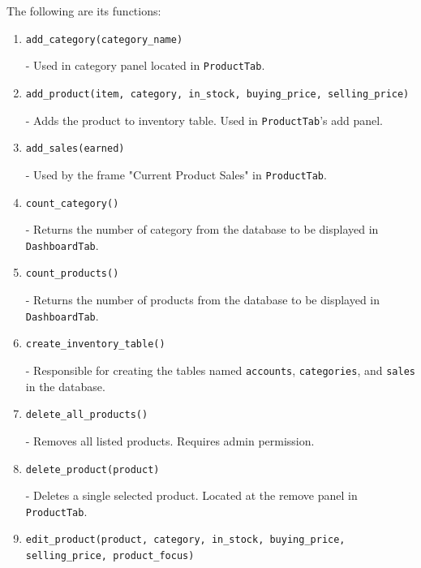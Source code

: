 \documentclass[12pt,a4paper]{article}
\renewcommand{\indent}{\hspace\parindent}
\begin{document}
        \hfill{}

        \indent The following are its functions:
        \begin{enumerate}
            \item[\ding{118}]\texttt{add\_category(category\_name)}

                - Used in category panel located in \texttt{ProductTab}.

            \item[\ding{118}]\texttt{add\_product(item, category, in\_stock, buying\_price, selling\_price)}

                - Adds the product to inventory table. Used in \texttt{ProductTab}'s 
                add panel.

            \item[\ding{118}]\texttt{add\_sales(earned)}

                - Used by the frame "Current Product Sales" in \texttt{ProductTab}.

            \item[\ding{118}]\texttt{count\_category()}

                - Returns the number of category from the database to be displayed 
                in \texttt{DashboardTab}.

            \item[\ding{118}]\texttt{count\_products()}

                - Returns the number of products from the database to be displayed 
                in \texttt{DashboardTab}.

            \item[\ding{118}]\texttt{create\_inventory\_table()}

                - Responsible for creating the tables named \texttt{accounts}, 
                \texttt{categories}, and \texttt{sales} in the database.

            \item[\ding{118}]\texttt{delete\_all\_products()}

                - Removes all listed products. Requires admin permission.

            \item[\ding{118}]\texttt{delete\_product(product)}

                - Deletes a single selected product. Located at the remove panel in 
                \texttt{ProductTab}.

            \item[\ding{118}]\texttt{edit\_product(product, category, in\_stock, buying\_price, selling\_price, product\_focus)}


\end{enumerate}
\end{document}

